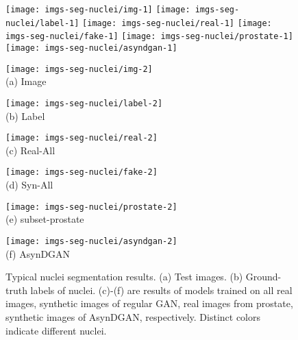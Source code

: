 \begin{figure*}[t]
	\vspace{-2em}
	\begin{center}
		\texttt{[image: imgs-seg-nuclei/img-1]}
		\texttt{[image: imgs-seg-nuclei/label-1]}
		\texttt{[image: imgs-seg-nuclei/real-1]}
		\texttt{[image: imgs-seg-nuclei/fake-1]}
		\texttt{[image: imgs-seg-nuclei/prostate-1]}
		\texttt{[image: imgs-seg-nuclei/asyndgan-1]} \\ \vspace{0.01in}
		\begin{minipage}{0.15\linewidth}
			\centering\texttt{[image: imgs-seg-nuclei/img-2]} \\ (a) Image
		\end{minipage}
		\begin{minipage}{0.15\linewidth}
			\centering\texttt{[image: imgs-seg-nuclei/label-2]} \\ (b) Label
		\end{minipage}
		\begin{minipage}{0.15\linewidth}
			\centering\texttt{[image: imgs-seg-nuclei/real-2]}  \\  (c) Real-All
		\end{minipage}
		\begin{minipage}{0.15\linewidth}
			\centering\texttt{[image: imgs-seg-nuclei/fake-2]} \\ (d) Syn-All
		\end{minipage}
		\begin{minipage}{0.15\linewidth}
			\centering\texttt{[image: imgs-seg-nuclei/prostate-2]} \\ (e) subset-prostate
		\end{minipage}
		\begin{minipage}{0.15\linewidth}
			\centering\texttt{[image: imgs-seg-nuclei/asyndgan-2]} \\ (f) AsynDGAN
		\end{minipage}
	\end{center}
	\caption{Typical nuclei segmentation results. (a) Test images. (b) Ground-truth labels of nuclei. (c)-(f) are results of models trained on all real images, synthetic images of regular GAN, real images from prostate, synthetic images of AsynDGAN, respectively. Distinct colors indicate different nuclei.}
	\label{fig:seg:nuclei}
\end{figure*}


